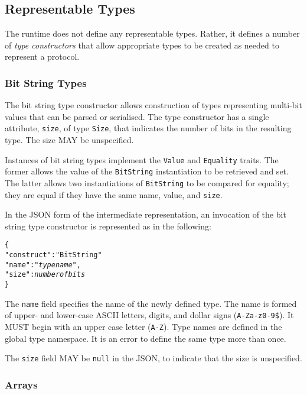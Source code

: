 \documentclass[10pt,twocolumn,a4paper]{article}
\newcommand{\code}[1]{\texttt{#1}}
\begin{document}
\subsection{Representable Types}
\label{sec:representable}

The runtime does not define any representable types. Rather, it defines
a number of \emph{type constructors} that allow appropriate types to be
created as needed to represent a protocol.

\subsubsection{Bit String Types}
\label{sec:bit-string}

The bit string type constructor allows construction of types representing
multi-bit values that can be parsed or serialised. The type constructor
has a single attribute, \code{size}, of type \code{Size}, that indicates
the number of bits in the resulting type. The size MAY be unspecified.

Instances of bit string types implement the \code{Value} and
\code{Equality} traits. The former allows the value of the \code{BitString}
instantiation to be retrieved and set. The latter allows two instantiations
of \code{BitString} to be compared for equality; they are equal if they
have the same name, value, and \code{size}.

In the JSON form of the intermediate representation, an invocation of the
bit string type constructor is represented as in the following:
\footnotesize
\begin{alltt}
  \{
    "construct" : "BitString"
    "name"      : "\emph{type name}",
    "size"      : \emph{number of bits}
  \}
\end{alltt}
\normalsize
The \code{name} field specifies the name of the newly defined type. The
name is formed of upper- and lower-case ASCII letters, digits, and dollar
signs (\code{A-Za-z0-9\$}).  It MUST begin with an upper case letter
(\code{A-Z}). Type names are defined in the global type namespace. 
It is an error to define the same type more than once.

The \code{size} field MAY be \code{null} in the JSON, to indicate that the
size is unspecified.

\subsubsection{Arrays}
\end{document}
